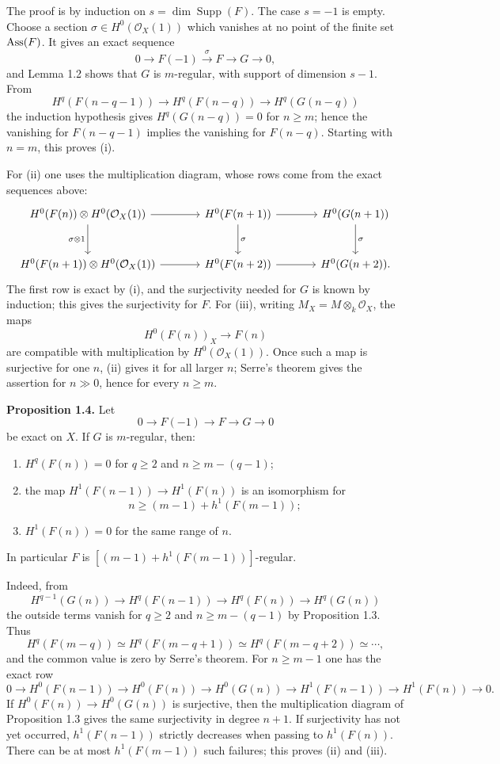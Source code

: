 \documentclass[11pt]{article}
\begin{document}
The proof is by induction on $s=\dim\operatorname{Supp}(F)$. The case $s=-1$ is empty. Choose a section $\sigma\in H^0(\mathcal O_X(1))$ which vanishes at no point of the finite set $\operatorname{Ass}(F)$. It gives an exact sequence
\[
0\longrightarrow F(-1)\xrightarrow{\sigma}F\longrightarrow G\longrightarrow 0,
\]
and Lemma 1.2 shows that $G$ is $m$-regular, with support of dimension $s-1$.
From
\[
H^q(F(n-q-1))\longrightarrow H^q(F(n-q))\longrightarrow H^q(G(n-q))
\]
the induction hypothesis gives $H^q(G(n-q))=0$ for $n\geq m$; hence the vanishing for $F(n-q-1)$ implies the vanishing for $F(n-q)$. Starting with $n=m$, this proves (i).

For (ii) one uses the multiplication diagram, whose rows come from the exact sequences above:
\[
\begin{tikzcd}[column sep=large,row sep=large]
H^0(F(n))\otimes H^0(\mathcal O_X(1)) \arrow[r] \arrow[d,"\sigma\otimes 1"'] & H^0(F(n+1)) \arrow[r] \arrow[d,"\sigma"] & H^0(G(n+1)) \arrow[d,"\sigma"] \\
H^0(F(n+1))\otimes H^0(\mathcal O_X(1)) \arrow[r] & H^0(F(n+2)) \arrow[r] & H^0(G(n+2)).
\end{tikzcd}
\]
The first row is exact by (i), and the surjectivity needed for $G$ is known by induction; this gives the surjectivity for $F$. For (iii), writing $M_X=M\otimes_k\mathcal O_X$, the maps
\[
H^0(F(n))_X\longrightarrow F(n)
\]
are compatible with multiplication by $H^0(\mathcal O_X(1))$. Once such a map is surjective for one $n$, (ii) gives it for all larger $n$; Serre's theorem gives the assertion for $n\gg0$, hence for every $n\ge m$.

\textbf{Proposition 1.4.} Let
\[
0\longrightarrow F(-1)\longrightarrow F\longrightarrow G\longrightarrow 0
\]
be exact on $X$. If $G$ is $m$-regular, then:
\begin{enumerate}[label=\roman*)]
\item $H^q(F(n))=0$ for $q\geq2$ and $n\geq m-(q-1)$;
\item the map $H^1(F(n-1))\to H^1(F(n))$ is an isomorphism for
\[
 n\ge (m-1)+h^1(F(m-1));
\]
\item $H^1(F(n))=0$ for the same range of $n$.
\end{enumerate}
In particular $F$ is $[(m-1)+h^1(F(m-1))]$-regular.

Indeed, from
\[
H^{q-1}(G(n))\longrightarrow H^q(F(n-1))\longrightarrow H^q(F(n))\longrightarrow H^q(G(n))
\]
the outside terms vanish for $q\ge2$ and $n\ge m-(q-1)$ by Proposition 1.3. Thus
\[
H^q(F(m-q))\simeq H^q(F(m-q+1))\simeq H^q(F(m-q+2))\simeq\cdots,
\]
and the common value is zero by Serre's theorem. For $n\ge m-1$ one has the exact row
\[
0\to H^0(F(n-1))\to H^0(F(n))\to H^0(G(n))\to H^1(F(n-1))\to H^1(F(n))\to0.
\]
If $H^0(F(n))\to H^0(G(n))$ is surjective, then the multiplication diagram of Proposition 1.3 gives the same surjectivity in degree $n+1$. If surjectivity has not yet occurred, $h^1(F(n-1))$ strictly decreases when passing to $h^1(F(n))$. There can be at most $h^1(F(m-1))$ such failures; this proves (ii) and (iii).
\end{document}
